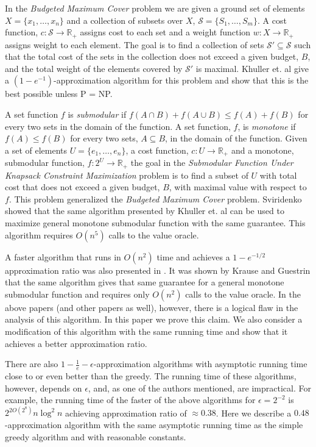 In the \emph{Budgeted Maximum Cover} problem we are given a ground set of elements
$X = \{x_1, \dots, x_n\}$ and a collection of subsets over $X$,
$\mathcal{S} = \{S_1, \dots, S_m\}$.
A cost function, $c:\mathcal{S} \to \mathbb{R}_+$ assigns cost to each set
and a weight function $w:X \to \mathbb{R}_+$ assigns weight to each element.
The goal is to find a collection of sets $\mathcal{S'} \subseteq \mathcal{S}$ 
such that the total cost of the sets in the collection does not exceed a given budget, 
$B$, and the
total weight of the elements covered by $\mathcal{S'}$ is maximal.
Khuller et. al \cite{khuller1999budgeted}
give a $(1-e^{-1})$-approximation algorithm for this problem and show that this
is the best possible unless P = NP.

A set function $f$ is \emph{submodular} if $f(A \cap B) + f(A \cup B) \leq f(A) + f(B)$
for every two sets in the domain of the function. A set function, $f$, 
is \emph{monotone} if
$f(A) \leq f(B)$ for every two sets, $A \subseteq B$, in the domain of the function.
Given a set of elements $U = \{e_1, \dots, e_n\}$, a cost function,
$c:U \to \mathbb{R}_+$ and a monotone, submodular function, $f:2^U \to \mathbb{R}_+$
the goal in the \emph{Submodular Function Under
    Knapsack Constraint Maximization} problem is to find a subset of $U$ with total cost that does not exceed
a given budget, $B$, with maximal value with respect to $f$.
This problem generalized the \emph{Budgeted Maximum Cover} problem.
Sviridenko \cite{sviridenko2004note} showed that the same algorithm presented by
Khuller et. al can be used to maximize general monotone submodular function
with the same guarantee.
This algorithm requires $O(n^5)$ calls to the value oracle.

A faster algorithm that runs in $O(n^2)$ time and achieves a $1 - e^{-1/2}$ approximation ratio
was also presented in \cite{khuller1999budgeted}.
It was shown by Krause and Guestrin \cite{krause2005note} that the same algorithm
gives that same guarantee for a general monotone submodular function and requires only
$O(n^2)$ calls to the value oracle.
In the above papers (and other papers as well), however,
there is a logical flaw in the analysis of this algorithm.
In this paper we prove this claim.
We also consider a modification of this algorithm with the same running time and show that it
achieves a better approximation ratio.

There are also $1 - \frac{1}{e} - \epsilon$-approximation algorithms
\cite{Alina2017, badanidiyuru2014fast} with asymptotic running time
close to or even better than the greedy.
The running time of these algorithms, however, depends on $\epsilon$, and,
as one of the authors mentioned, are impractical.
For example, the running time of the faster of the above algorithms for $\epsilon = 2^{-2}$ is
$2^{2O(2^{8})}n\log^2n$ achieving approximation ratio of $\approx 0.38$.
Here we describe a $0.48$-approximation algorithm with the same
asymptotic running time as the simple greedy algorithm and with reasonable constants.
